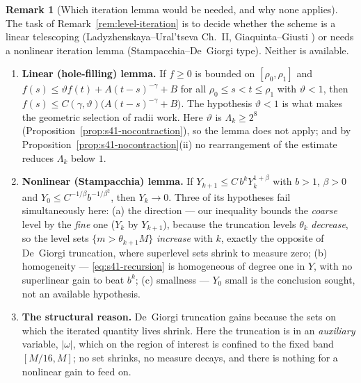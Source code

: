 \documentclass[11pt]{article}
\theoremstyle{definition}
\newtheorem{remark}[theorem]{Remark}
\theoremstyle{remark}
\begin{document}
\begin{remark}[Which iteration lemma would be needed, and why none applies]
  \label{rem:s41-whichlemma}
  The task of Remark~\ref{rem:level-iteration} is to decide whether the
  scheme is a linear telescoping (Ladyzhenskaya--Ural'tseva Ch.~II,
  Giaquinta--Giusti \cite{Giaquinta1982,Giusti2003}) or needs a nonlinear
  iteration lemma (Stampacchia--De~Giorgi type). Neither is available.
  \begin{enumerate}[label=(\roman*)]
    \item \textbf{Linear (hole-filling) lemma.} If $f\geq0$ is bounded on
      $[\rho_0,\rho_1]$ and $f(s)\leq\vartheta f(t)+A(t-s)^{-\gamma}+B$ for
      all $\rho_0\leq s<t\leq\rho_1$ with $\vartheta<1$, then
      $f(s)\leq C(\gamma,\vartheta)\bigl(A(t-s)^{-\gamma}+B\bigr)$. The
      hypothesis $\vartheta<1$ is what makes the geometric selection of
      radii work. Here $\vartheta$ is $\Lambda_k\geq2^{8}$
      (Proposition~\ref{prop:s41-nocontraction}), so the lemma does not
      apply; and by Proposition~\ref{prop:s41-nocontraction}(ii) no
      rearrangement of the estimate reduces $\Lambda_k$ below $1$.
    \item \textbf{Nonlinear (Stampacchia) lemma.} If
      $Y_{k+1}\leq C\,b^{k}Y_k^{1+\beta}$ with $b>1$, $\beta>0$ and
      $Y_0\leq C^{-1/\beta}b^{-1/\beta^2}$, then $Y_k\to0$. Three of its
      hypotheses fail simultaneously here: (a) the direction --- our
      inequality bounds the \emph{coarse} level by the \emph{fine} one
      ($Y_k$ by $Y_{k+1}$), because the truncation levels
      $\theta_k$ \emph{decrease}, so the level sets $\{m>\theta_{k+1}M\}$
      \emph{increase} with $k$, exactly the opposite of De~Giorgi
      truncation, where superlevel sets shrink to measure zero; (b)
      homogeneity --- \eqref{eq:s41-recursion} is homogeneous of degree one
      in $Y$, with no superlinear gain to beat $b^{k}$; (c) smallness ---
      $Y_0$ small is the conclusion sought, not an available hypothesis.
    \item \textbf{The structural reason.} De~Giorgi truncation gains because
      the sets on which the iterated quantity lives shrink. Here the
      truncation is in an \emph{auxiliary} variable, $|\omega|$, which on
      the region of interest is confined to the fixed band
      $[M/16,M]$; no set shrinks, no measure decays, and there is
      nothing for a nonlinear gain to feed on.
  \end{enumerate}
\end{remark}
\end{document}

